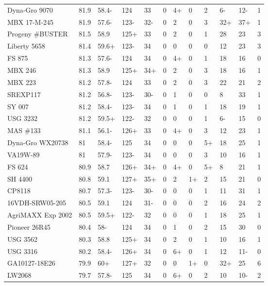 \documentclass[12pt, letterpaper]{article}
\begin{document}
\begin{landscape}
\begin{ThreePartTable}
\begin{longtable}{llllllllllll}
  Dyna-Gro 9070 & 81.9 & 58.4- & 124 & 33 & 0 & 4+ & 0 & 2 & 6- & 12- & 1 \\ 
  MBX 17-M-245 & 81.9 & 57.6- & 123- & 32- & 0 & 2 & 0 & 3 & 32+ & 37+ & 1 \\ 
  Progeny \#BUSTER & 81.5 & 58.9 & 125+ & 33 & 0 & 2 & 0 & 1 & 28 & 23 & 3 \\ 
  Liberty 5658 & 81.4 & 59.6+ & 123- & 34 & 0 & 0 & 0 & 0 & 12 & 23 & 3 \\ 
  FS 875 & 81.3 & 57.6- & 124 & 34 & 0 & 4+ & 0 & 1 & 18 & 16 & 0 \\ 
  MBX 246 & 81.3 & 58.9 & 125+ & 34+ & 0 & 2 & 0 & 3 & 18 & 16 & 1 \\ 
  MBX 223 & 81.2 & 57.8- & 124 & 33 & 0 & 2 & 0 & 3 & 22 & 21 & 2 \\ 
  SREXP117 & 81.2 & 56.8- & 123- & 30- & 0 & 1 & 0 & 0 & 8 & 33 & 1 \\ 
  SY 007 & 81.2 & 58.4- & 123- & 34 & 0 & 1 & 0 & 1 & 18 & 19 & 1 \\ 
  USG 3232 & 81.2 & 59.5+ & 122- & 32 & 0 & 0 & 0 & 1 & 6- & 15 & 0 \\ 
  MAS \#133 & 81.1 & 56.1- & 126+ & 33 & 0 & 4+ & 0 & 3 & 12 & 23 & 1 \\ 
  Dyna-Gro WX20738 & 81 & 58.4- & 125 & 34 & 0 & 0 & 0 & 5+ & 18 & 25 & 1 \\ 
  VA19W-89 & 81 & 57.9- & 123- & 34 & 0 & 0 & 0 & 3 & 10 & 16 & 1 \\ 
  FS 624 & 80.9 & 58.7 & 126+ & 34+ & 0 & 4+ & 0 & 5+ & 8 & 21 & 1 \\ 
  SH 4400 & 80.8 & 59.1 & 127+ & 35+ & 0 & 2 & 1+ & 2 & 15 & 21 & 0 \\ 
  CP8118 & 80.7 & 57.3- & 123- & 30- & 0 & 0 & 0 & 1 & 11 & 31 & 1 \\ 
  16VDH-SRW05-205 & 80.5 & 59.1 & 124 & 31- & 0 & 0 & 0 & 2 & 16 & 24 & 2 \\ 
  AgriMAXX Exp 2002 & 80.5 & 59.5+ & 122- & 32 & 0 & 0 & 0 & 1 & 18 & 25 & 1 \\ 
  Pioneer 26R45 & 80.4 & 58- & 124 & 34 & 0 & 1 & 0 & 2 & 15 & 30 & 0 \\ 
  USG 3562 & 80.3 & 58.8 & 125+ & 34 & 0 & 2 & 0 & 1 & 10 & 16 & 1 \\ 
  USG 3316 & 80.2 & 58.4- & 126+ & 34 & 0 & 6+ & 0 & 1 & 12 & 11- & 0 \\ 
  GA10127-18E26 & 79.9 & 60+ & 127+ & 32 & 0 & 0 & 1+ & 0 & 32+ & 25 & 6 \\ 
  LW2068 & 79.7 & 57.8- & 125 & 34 & 0 & 6+ & 0 & 2 & 10 & 10- & 2 \\ 

\end{longtable}
\end{ThreePartTable}
\end{landscape}
\end{document}
